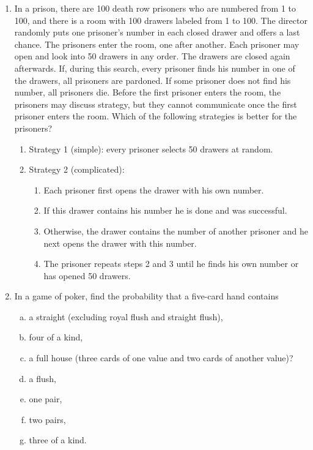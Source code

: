 \documentclass[12pt]{article}
\begin{document}
\begin{enumerate}[1.]
\item In a prison, there are 100 death row prisoners who are numbered from 1 to
  100, and there is a room with 100 drawers labeled from 1 to 100. The director
  randomly puts one prisoner's number in each closed drawer and offers a last
  chance. The prisoners enter the room, one after another. Each prisoner may
  open and look into 50 drawers in any order. The drawers are closed again
  afterwards. If, during this search, every prisoner finds his number in one of
  the drawers, all prisoners are pardoned. If some prisoner does not find his
  number, all prisoners die. Before the first prisoner enters the room, the
  prisoners may discuss strategy, but they cannot communicate once the first
  prisoner enters the room.
  Which of the following strategies is better for the prisoners? 
  \begin{enumerate}
  \item Strategy 1 (simple): every prisoner selects 50 drawers at random.
  \item Strategy 2 (complicated): 
    \begin{enumerate}
    \item Each prisoner first opens the drawer with his own number.
    \item If this drawer contains his number he is done and was
      successful.
    \item Otherwise, the drawer contains the number of another prisoner
      and he next opens the drawer with this number.
    \item The prisoner repeats steps 2 and 3 until he finds his own number
      or has opened 50 drawers.
    \end{enumerate}
  \end{enumerate}
\item In a game of poker, find the probability that a five-card hand contains
  \begin{enumerate}[(a)]
  \item a straight (excluding royal flush and straight flush),
  \item four of a kind,
  \item a full house (three cards of one value and two cards of
    another value)?
  \item a flush,
  \item one pair,
  \item two pairs,
  \item three of a kind.
  \end{enumerate}
\end{enumerate}
\end{document}
